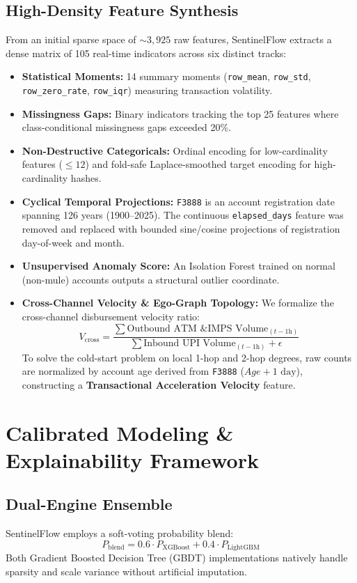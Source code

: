 \documentclass[conference]{IEEEtran}
\begin{document}
\subsection{High-Density Feature Synthesis}
From an initial sparse space of $\sim3{,}925$ raw features, SentinelFlow extracts a dense matrix of 105 real-time indicators across six distinct tracks:
\begin{itemize}
    \item \textbf{Statistical Moments:} 14 summary moments (\texttt{row\_mean}, \texttt{row\_std}, \texttt{row\_zero\_rate}, \texttt{row\_iqr}) measuring transaction volatility.
    \item \textbf{Missingness Gaps:} Binary indicators tracking the top 25 features where class-conditional missingness gaps exceeded 20\%.
    \item \textbf{Non-Destructive Categoricals:} Ordinal encoding for low-cardinality features ($\le 12$) and fold-safe Laplace-smoothed target encoding for high-cardinality hashes.
    \item \textbf{Cyclical Temporal Projections:} \texttt{F3888} is an account registration date spanning 126 years (1900--2025). The continuous \texttt{elapsed\_days} feature was removed and replaced with bounded sine/cosine projections of registration day-of-week and month.
    \item \textbf{Unsupervised Anomaly Score:} An Isolation Forest trained on normal (non-mule) accounts outputs a structural outlier coordinate.
    \item \textbf{Cross-Channel Velocity \& Ego-Graph Topology:} We formalize the cross-channel disbursement velocity ratio:
    \begin{equation}
    V_{\text{cross}} = \frac{\sum \text{Outbound ATM \& IMPS Volume}_{(t - 1\text{h})}}{\sum \text{Inbound UPI Volume}_{(t - 1\text{h})} + \epsilon}
    \label{eq:vcross}
    \end{equation}
    To solve the cold-start problem on local 1-hop and 2-hop degrees, raw counts are normalized by account age derived from \texttt{F3888} ($Age + 1\text{ day}$), constructing a \textbf{Transactional Acceleration Velocity} feature.
\end{itemize}

\section{Calibrated Modeling \& Explainability Framework}

\subsection{Dual-Engine Ensemble}
SentinelFlow employs a soft-voting probability blend:
\begin{equation}
P_{\text{blend}} = 0.6 \cdot P_{\text{XGBoost}} + 0.4 \cdot P_{\text{LightGBM}}
\label{eq:blend}
\end{equation}
Both Gradient Boosted Decision Tree (GBDT) implementations natively handle sparsity and scale variance without artificial imputation.
\end{document}
